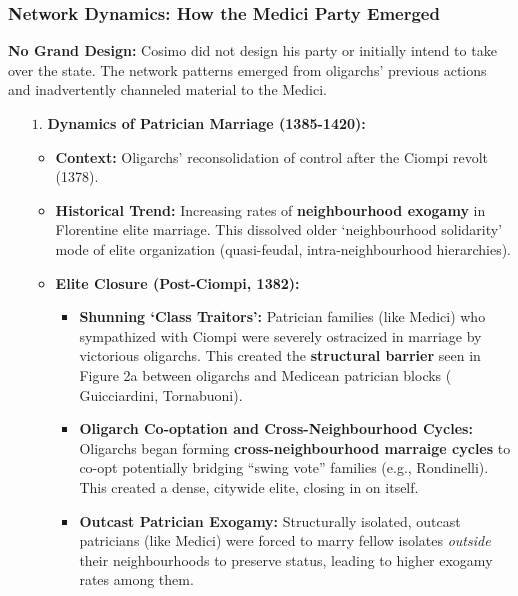\documentclass{article}
\begin{document}
    \subsubsection{Network Dynamics: How the Medici Party Emerged}

    \noindent \textbf{No Grand Design:} Cosimo did not design his party or
initially intend to take over the state. The network patterns emerged from
oligarchs' previous actions and inadvertently channeled material to the Medici.

    \begin{itemize}
        \item [$1$.] \textbf{Dynamics of Patrician Marriage (1385-1420):}
        \begin{itemize}
            \item \textbf{Context:} Oligarchs' reconsolidation of control
            after the Ciompi revolt (1378).
            \item \textbf{Historical Trend:} Increasing rates of
            \textbf{neighbourhood exogamy} in Florentine elite marriage.
            This dissolved older `neighbourhood solidarity' mode of elite
            organization (quasi-feudal, intra-neighbourhood hierarchies).
            \item \textbf{Elite Closure (Post-Ciompi, 1382):}
            \begin{itemize}
                \item \textbf{Shunning `Class Traitors':} Patrician
                families (like Medici) who sympathized with Ciompi were
                severely ostracized in marriage by victorious oligarchs.
                This created the \textbf{structural barrier} seen in Figure
                2a between oligarchs and Medicean patrician blocks (
                Guicciardini, Tornabuoni).
                \item
                \textbf{Oligarch Co-optation and Cross-Neighbourhood Cycles:} Oligarchs began forming \textbf{cross-neighbourhood marraige cycles} to co-opt potentially bridging ``swing vote'' families (e.g., Rondinelli). This created a dense, citywide elite, closing in on itself.
                \item \textbf{Outcast Patrician Exogamy:} Structurally
                isolated, outcast patricians (like Medici) were forced to
                marry fellow isolates \textit{outside} their neighbourhoods
                to preserve status, leading to higher exogamy rates among them.
            \end{itemize}

\end{itemize}
\end{itemize}
\end{document}
